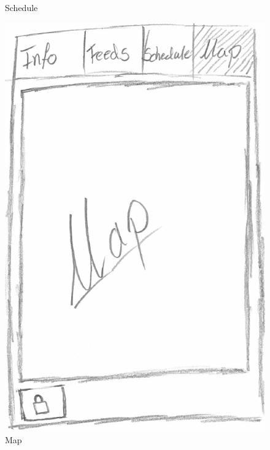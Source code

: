 \begin{figure}[H]
\begin{minipage}[b]{0.5\columnwidth}
\caption{Schedule\label{fig:schedule}}
\end{minipage}
\end{figure}

\begin{figure}[H]
\begin{minipage}[b]{0.5\columnwidth}
\centering
\includegraphics[width=0.7\columnwidth]{img/prototype/7.png}
\caption{Map\label{fig:map}}
\end{minipage}
\hspace{0.5cm}
\begin{minipage}[b]{0.5\columnwidth}
\centering

\end{minipage}
\end{figure}
